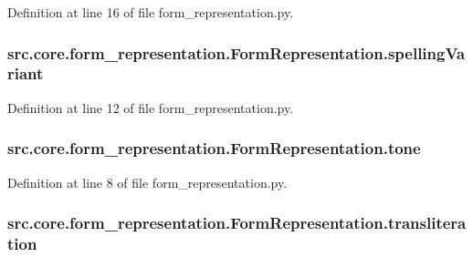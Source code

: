 Definition at line 16 of file form\+\_\+representation.\+py.

\hypertarget{classsrc_1_1core_1_1form__representation_1_1_form_representation_acbb491e2075ba5ce28b7159e1fa42154}{
\subsubsection[{spelling\+Variant}]{\setlength{\rightskip}{0pt plus 5cm}src.\+core.\+form\+\_\+representation.\+Form\+Representation.\+spelling\+Variant}}\label{classsrc_1_1core_1_1form__representation_1_1_form_representation_acbb491e2075ba5ce28b7159e1fa42154}


Definition at line 12 of file form\+\_\+representation.\+py.

\hypertarget{classsrc_1_1core_1_1form__representation_1_1_form_representation_a5b9d85ec2c63d3d93f09da2c569234a0}{
\subsubsection[{tone}]{\setlength{\rightskip}{0pt plus 5cm}src.\+core.\+form\+\_\+representation.\+Form\+Representation.\+tone}}\label{classsrc_1_1core_1_1form__representation_1_1_form_representation_a5b9d85ec2c63d3d93f09da2c569234a0}


Definition at line 8 of file form\+\_\+representation.\+py.

\hypertarget{classsrc_1_1core_1_1form__representation_1_1_form_representation_afe034e736b48176000fca76d8b8604ef}{
\subsubsection[{transliteration}]{\setlength{\rightskip}{0pt plus 5cm}src.\+core.\+form\+\_\+representation.\+Form\+Representation.\+transliteration}}\label{classsrc_1_1core_1_1form__representation_1_1_form_representation_afe034e736b48176000fca76d8b8604ef}


